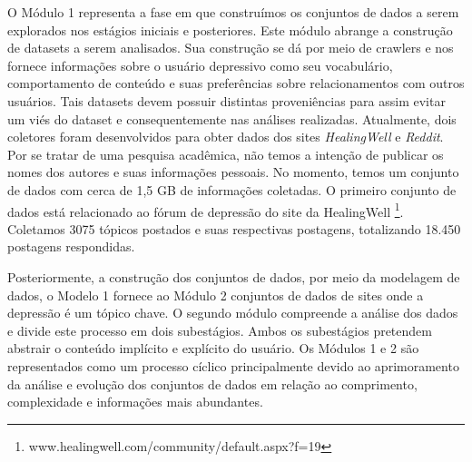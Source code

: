 \documentclass[11pt, notitlepage]{article} %
\begin{document}
O Módulo 1 representa a fase em que construímos os conjuntos de dados a serem explorados nos estágios iniciais e posteriores. Este módulo abrange a construção de datasets a serem analisados. Sua construção se dá por meio de crawlers e nos fornece informações sobre o usuário depressivo como seu vocabulário, comportamento de conteúdo e suas preferências sobre relacionamentos com outros usuários. Tais datasets devem possuir distintas proveniências para assim evitar um viés do dataset e consequentemente nas análises realizadas.
Atualmente, dois coletores foram desenvolvidos para obter dados dos sites \textit{HealingWell} e \textit{Reddit}. Por se tratar de uma pesquisa acadêmica, não temos a intenção de publicar os nomes dos autores e suas informações pessoais. No momento, temos um conjunto de dados com cerca de 1,5 GB de informações coletadas. O primeiro conjunto de dados está relacionado ao fórum de depressão do site da HealingWell \footnote{www.healingwell.com/community/default.aspx?f=19}. Coletamos 3075 tópicos postados e suas respectivas postagens, totalizando 18.450 postagens respondidas.

Posteriormente, a construção dos conjuntos de dados, por meio da modelagem de dados, o Modelo 1 fornece ao Módulo 2 conjuntos de dados de sites onde a depressão é um tópico chave. O segundo módulo compreende a análise dos dados e divide este processo em dois subestágios. Ambos os subestágios pretendem abstrair o conteúdo implícito e explícito do usuário. Os Módulos 1 e 2 são representados como um processo cíclico principalmente devido ao aprimoramento da análise e evolução dos conjuntos de dados em relação ao comprimento, complexidade e informações mais abundantes.  
\end{document}
